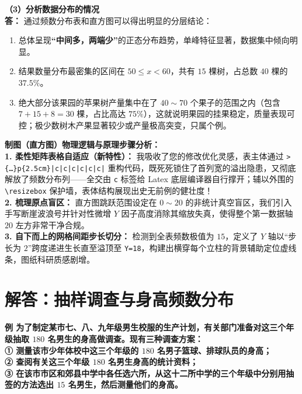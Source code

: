\vspace{0.6cm}

\textbf{（3）分析数据分布的情况} \\
\textbf{答：} 通过频数分布表和直方图可以得出明显的分层结论：
\begin{enumerate}
    \item 总体呈现\textbf{“中间多，两端少”}的正态分布趋势，单峰特征显著，数据集中倾向明显。
    \item 结果数量分布最密集的区间在 $50 \leqslant x < 60$，共有 $15$ 棵树，占总数 $40$ 棵的 $37.5\%$。
    \item 绝大部分该果园的苹果树产量集中在了 $40 \sim 70$ 个果子的范围之内（包含 $7 + 15 + 8 = 30$ 棵，占比高达 $75\%$），这就说明果园的挂果稳定，质量表现可控；极少数树木产果显著较少或产量极高突变，只属个例。
\end{enumerate}

\vspace{0.6cm}

{\small\color{blue!70!black}
\textbf{制图（直方图）物理逻辑与原理步骤分析：}\\
\textbf{1. 柔性矩阵表格自适应（新特性）：} 我吸收了您的修改优化灵感，表主体通过 \texttt{>\{\dots\}p\{2.5cm\}|c|c|c|c|c|c|} 重构代码，既死死锁住了首列宽的溢出隐患，又彻底解放了频数分布列——全交由 \texttt{c} 标签给 Latex 底层编译器自行撑开；辅以外围的 \texttt{\textbackslash resizebox} 保护墙，表体结构展现出史无前例的健壮度！\\
\textbf{2. 梳理原点盲区：} 直方图跳跃范围设定在 $0 \sim 20$ 的非统计真空盲区，我们引入手写断崖波浪号并针对性微增 $Y$ 因子高度消除其缩放失真，使得整个第一数据轴 $20$ 左方非常干净合规。\\
\textbf{3. 自下而上的网格间距步长切分：} 检测到全表频数极值为 $15$，定义了 $Y$ 轴以“步长为 $2$”跨度递进生长直至溢顶至 \texttt{Y=18}，构建出横穿每个立柱的背景辅助定位虚线条，图纸科研质感剧增。
}

\newpage



\section{解答：抽样调查与身高频数分布}

\vspace{0.6cm}

\textbf{例 为了制定某市七、八、九年级男生校服的生产计划，有关部门准备对这三个年级抽取 $180$ 名男生的身高做调查。现有三种调查方案：\\
① 测量该市少年体校中这三个年级的 $180$ 名男子篮球、排球队员的身高；\\
② 查阅有关这三个年级 $180$ 名男生身高的统计资料；\\
③ 在该市市区和郊县中学中各任选六所，从这十二所中学的三个年级中分别用抽签的方法选出 $15$ 名男生，然后测量他们的身高。}

